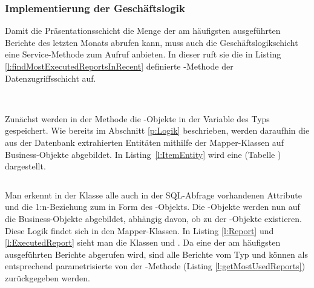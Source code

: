 \subsubsection{Implementierung der Geschäftslogik}\label{sec:ImplementierungGeschaeftslogik}
Damit die Präsentationsschicht die Menge der am häufigsten ausgeführten Berichte des letzten Monats abrufen kann, muss auch die Geschäftslogikschicht eine Service-Methode zum Aufruf anbieten. In dieser ruft sie die in Listing \ref{l:findMostExecutedReportsInRecent} definierte -Methode der Datenzugriffsschicht auf.
\begin{listing}[ht]
  \inputminted{java}{Listings/getMostUsedReports().java}
  \caption{}
  \label{l:getMostUsedReports}
\end{listing}\\
Zunächst werden in der Methode die -Objekte in der Variable  des Typs  gespeichert.
Wie bereits im Abschnitt \ref{p:Logik} beschrieben, werden daraufhin die aus der Datenbank extrahierten Entitäten mithilfe der Mapper-Klassen auf Business-Objekte abgebildet. In Listing~\ref{l:ItemEntity} wird eine  (Tabelle ) dargestellt.
\begin{listing}[ht]
  \inputminted{java}{Listings/ItemEntity.java}
  \caption{}
  \label{l:ItemEntity}
\end{listing}
Man erkennt in der Klasse alle auch in der SQL-Abfrage vorhandenen Attribute und die 1:n-Beziehung zum  in Form des -Objekts. Die -Objekte werden nun auf die Business-Objekte  \bzw {} abgebildet, abhängig davon, ob zu der  -Objekte existieren. Diese Logik findet sich in den Mapper-Klassen. In Listing \ref{l:Report} und \ref{l:ExecutedReport} sieht man die Klassen  und . Da eine  der am häufigsten ausgeführten Berichte abgerufen wird, sind alle Berichte vom Typ  und können als entsprechend parametrisierte  von der -Methode (Listing \ref{l:getMostUsedReports}) zurückgegeben werden.
\begin{listing}[ht]
  \inputminted{java}{Listings/Report.java}
  \caption{}
  \label{l:Report}
\end{listing}
\begin{listing}[ht]
  \inputminted{java}{Listings/ExecutedReport.java}
  \caption{}
  \label{l:ExecutedReport}
\end{listing}

